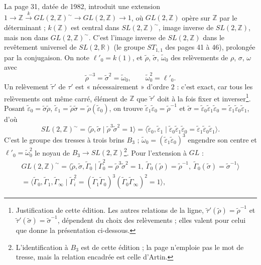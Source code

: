 \documentclass[11pt,a4paper]{article}
\begin{document}
La page 31, datée de 1982, introduit une extension
$1 \to \mathbb{Z} \xrightarrow{k} GL(2, \mathbb{Z})^{\sim} \to GL(2, \mathbb{Z}) \to 1$,
où $GL(2, \mathbb{Z})$ opère sur $\mathbb{Z}$ par le déterminant ; $k(\mathbb{Z})$
est central dans $SL(2, \mathbb{Z})^{\sim}$, image inverse de $SL(2, \mathbb{Z})$,
mais non dans $GL(2, \mathbb{Z})^{\sim}$. C'est l'image inverse de
$SL(2, \mathbb{Z})$ dans le revêtement universel de $SL(2, \mathbb{R})$ (le
groupe $ST_{1,1}$ des pages 41 à 46), prolongée par la conjugaison. On note
$\ell'_0 = k(1)$, et $\tilde\rho$, $\tilde\sigma$, $\tilde\omega_0$ des
relèvements de $\rho$, $\sigma$, $\omega$ avec
\[
\tilde\rho^{-3} = \tilde\sigma^2 = \tilde\omega_0, \qquad \tilde\omega_0^2 = \ell'_0 .
\]
Un relèvement $\tilde\tau'$ de $\tau'$ est « nécessairement » d'ordre $2$ :
c'est exact, car tous les relèvements ont même carré, élément de $\mathbb{Z}$
que $\tilde\tau'$ doit à la fois fixer et inverser\footnote{Justification de
cette édition. Les autres relations de la ligne,
$\tilde\tau'(\tilde\rho) = \tilde\rho^{-1}$ et
$\tilde\tau'(\tilde\sigma) = \tilde\sigma^{-1}$, dépendent du choix des
relèvements ; elles valent pour celui que donne la présentation ci-dessous.}.
Posant $\tilde\varepsilon_0 = \tilde\sigma\tilde\rho$,
$\tilde\varepsilon_1 = \tilde\rho\tilde\sigma = \tilde\rho(\tilde\varepsilon_0)$,
on trouve $\tilde\varepsilon_1\tilde\varepsilon_0 = \tilde\rho^{-1}$ et
$\tilde\sigma = \tilde\varepsilon_0\tilde\varepsilon_1\tilde\varepsilon_0 = \tilde\varepsilon_1\tilde\varepsilon_0\tilde\varepsilon_1$, d'où
\[
SL(2, \mathbb{Z})^{\sim} = \langle \tilde\rho, \tilde\sigma \mid \tilde\rho^3\tilde\sigma^2 = 1 \rangle
= \langle \tilde\varepsilon_0, \tilde\varepsilon_1 \mid
\tilde\varepsilon_0\tilde\varepsilon_1\tilde\varepsilon_0 = \tilde\varepsilon_1\tilde\varepsilon_0\tilde\varepsilon_1 \rangle .
\]
C'est le groupe des tresses à trois brins $B_3$ ; $\tilde\omega_0 = (\tilde\varepsilon_1\tilde\varepsilon_0)^3$
engendre son centre et $\ell'_0 = \tilde\omega_0^2$ le noyau de
$B_3 \to SL(2, \mathbb{Z})$\footnote{L'identification à $B_3$ est de cette
édition ; la page n'emploie pas le mot de tresse, mais la relation encadrée est
celle d'Artin.}. Pour l'extension à $GL$ :
\[
\begin{gathered}
GL(2, \mathbb{Z})^{\sim} = \langle \tilde\rho, \tilde\sigma, \tilde\Gamma_0 \mid
\tilde\Gamma_0^2 = \tilde\rho^3\tilde\sigma^2 = 1,\ \tilde\Gamma_0(\tilde\rho) = \tilde\rho^{-1},\ \tilde\Gamma_0(\tilde\sigma) = \tilde\sigma^{-1} \rangle \\
= \langle \tilde\Gamma_0, \tilde\Gamma_1, \tilde\Gamma_\infty \mid
\tilde\Gamma_i^2 = (\tilde\Gamma_1\tilde\Gamma_0)^3(\tilde\Gamma_0\tilde\Gamma_\infty)^2 = 1 \rangle,
\end{gathered}
\]
\end{document}
